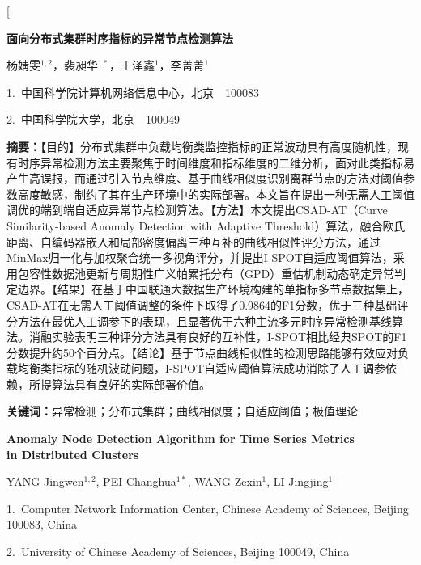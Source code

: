 \documentclass[10.5pt,a4paper,twocolumn]{ctexart}
\begin{document}
\twocolumn[
\begin{@twocolumnfalse}
\begin{center}

{\bfseries 面向分布式集群时序指标的异常节点检测算法\par}
\vspace{0.8em}

{ 杨婧雯$^{1,2}$，裴昶华$^{1*}$，王泽鑫$^{1}$，李菁菁$^{1}$\par}
\vspace{0.3em}
{ 1.~中国科学院计算机网络信息中心，北京~~100083\par}
\vspace{0.1em}
{ 2.~中国科学院大学，北京~~100049\par}
\vspace{1em}

\parbox{0.92\textwidth}{
\textbf{摘\quad 要：}【目的】分布式集群中负载均衡类监控指标的正常波动具有高度随机性，现有时序异常检测方法主要聚焦于时间维度和指标维度的二维分析，面对此类指标易产生高误报，而通过引入节点维度、基于曲线相似度识别离群节点的方法对阈值参数高度敏感，制约了其在生产环境中的实际部署。本文旨在提出一种无需人工阈值调优的端到端自适应异常节点检测算法。【方法】本文提出CSAD-AT（Curve Similarity-based Anomaly Detection with Adaptive Threshold）算法，融合欧氏距离、自编码器嵌入和局部密度偏离三种互补的曲线相似性评分方法，通过MinMax归一化与加权聚合统一多视角评分，并提出I-SPOT自适应阈值算法，采用包容性数据池更新与周期性广义帕累托分布（GPD）重估机制动态确定异常判定边界。【结果】在基于中国联通大数据生产环境构建的单指标多节点数据集上，CSAD-AT在无需人工阈值调整的条件下取得了0.9864的F1分数，优于三种基础评分方法在最优人工调参下的表现，且显著优于六种主流多元时序异常检测基线算法。消融实验表明三种评分方法具有良好的互补性，I-SPOT相比经典SPOT的F1分数提升约50个百分点。【结论】基于节点曲线相似性的检测思路能够有效应对负载均衡类指标的随机波动问题，I-SPOT自适应阈值算法成功消除了人工调参依赖，所提算法具有良好的实际部署价值。
}
\vspace{0.4em}

\parbox{0.92\textwidth}{
\textbf{关键词：}异常检测；分布式集群；曲线相似度；自适应阈值；极值理论
}
\vspace{1.2em}

{\bfseries Anomaly Node Detection Algorithm for Time Series Metrics\\ in Distributed Clusters\par}
\vspace{0.6em}
{ YANG Jingwen$^{1,2}$, PEI Changhua$^{1*}$, WANG Zexin$^{1}$, LI Jingjing$^{1}$\par}
\vspace{0.3em}
{ 1.~Computer Network Information Center, Chinese Academy of Sciences, Beijing 100083, China\par}
\vspace{0.1em}
{ 2.~University of Chinese Academy of Sciences, Beijing 100049, China\par}
\vspace{0.8em}


\end{center}
\end{@twocolumnfalse}
\end{document}
